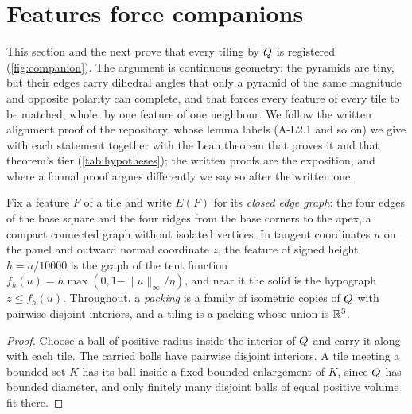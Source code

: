 \section{Features force companions}\label{sec:companions}

This section and the next prove that every tiling by $Q$ is registered
(\cref{fig:companion}). The argument is
continuous geometry: the pyramids are tiny, but their edges carry dihedral angles that only a
pyramid of the same magnitude and opposite polarity can complete, and that forces every feature
of every tile to be matched, whole, by one feature of one neighbour. We follow the written
alignment proof of the repository, whose lemma labels (A-L2.1 and so on) we give with each
statement together with the Lean theorem that proves it and that theorem's tier
(\cref{tab:hypotheses}); the written proofs are the exposition, and where a formal proof argues
differently we say so after the written one.

Fix a feature $F$ of a tile and write $E(F)$ for its \emph{closed edge graph}: the four edges of
the base square and the four ridges from the base corners to the apex, a compact connected graph
without isolated vertices. In tangent coordinates $u$ on the panel and outward normal coordinate
$z$, the feature of signed height $h=a/10000$ is the graph of the tent function
$f_h(u)=h\max(0,1-\|u\|_\infty/\eta)$, and near it the solid is the hypograph $z\le f_h(u)$.
Throughout, a \emph{packing} is a family of isometric copies of $Q$ with pairwise disjoint
interiors, and a tiling is a packing whose union is $\mathbb{R}^3$.


\begin{proof}
Choose a ball of positive radius inside the interior of $Q$ and carry it along with each
tile. The carried balls have pairwise disjoint interiors. A tile meeting a bounded set $K$ has its
ball inside a fixed bounded enlargement of $K$, since $Q$ has bounded diameter, and only
finitely many disjoint balls of equal positive volume fit there.
\end{proof}


